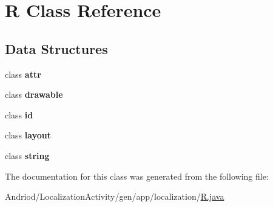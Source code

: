 \hypertarget{classapp_1_1localization_1_1_r}{\section{R Class Reference}
\label{classapp_1_1localization_1_1_r}
}
\subsection*{Data Structures}
\begin{DoxyCompactItemize}
\item 
class {\bfseries attr}
\item 
class {\bfseries drawable}
\item 
class {\bfseries id}
\item 
class {\bfseries layout}
\item 
class {\bfseries string}
\end{DoxyCompactItemize}


The documentation for this class was generated from the following file\-:\begin{DoxyCompactItemize}
\item 
Andriod/\-Localization\-Activity/gen/app/localization/\hyperlink{_localization_activity_2gen_2app_2localization_2_r_8java}{R.\-java}\end{DoxyCompactItemize}
